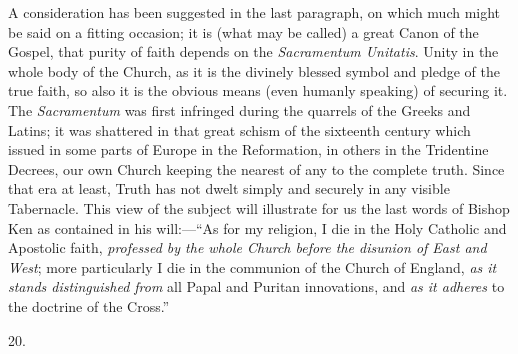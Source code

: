 A consideration has been suggested in the last
paragraph, on which much might be said on a fitting occasion; it is
(what may be called) a great Canon of the Gospel, that purity of faith
depends on the \emph{Sacramentum Unitatis}. Unity in the whole body of
the Church, as it is the divinely blessed symbol and pledge of the
true faith, so also it is the obvious means (even humanly speaking) of
securing it. The \emph{Sacramentum} was first infringed during the
quarrels of the Greeks and Latins; it was shattered in that great
schism of the sixteenth century which issued in some parts of Europe
in the Reformation, in others in the Tridentine Decrees, our own
Church keeping the nearest of any to the complete truth. Since that
era at least, Truth has not dwelt simply and securely in any visible
Tabernacle. This view of the subject will illustrate for us the last
words of Bishop Ken as contained in his will:—``As for my religion, I
die in the Holy Catholic and Apostolic faith, \emph{professed by the
whole Church before the disunion of East and West}; more
particularly I die in the communion of the Church of England, \emph{as it
stands distinguished from} all Papal and Puritan innovations, and \emph{as
it adheres} to the doctrine of the Cross.''

20.


